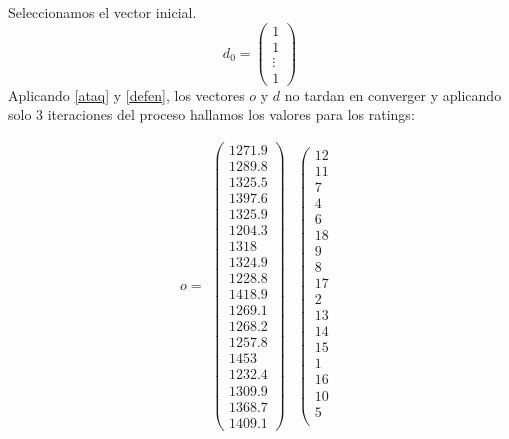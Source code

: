 	Seleccionamos el vector inicial.
	\begin{equation*}
		d_{0} = 
		\left( \begin{array}{c}
			1\\
			1\\
			\vdots\\
			1
		\end{array}\right) 
	\end{equation*}
	Aplicando \ref{ataq} y \ref{defen}, los vectores $o$ y $d$ no tardan en converger y aplicando solo 3 iteraciones del proceso hallamos los valores para los ratings:
	
	\[o=
	\begin{array}{ccc}
	\left(\begin{array}{c}
				1271.9\\
				1289.8\\
				1325.5\\
				1397.6\\
				1325.9\\
				1204.3\\
				1318\\
				1324.9\\
				1228.8\\
				1418.9\\
				1269.1\\
				1268.2\\
				1257.8\\
				1453\\
				1232.4\\
				1309.9\\
				1368.7\\
				1409.1
	\end{array} \right) & \left(\begin{array}{c}
				12\\
				11\\
				7\\
				4\\
				6\\
				18\\
				9\\
				8\\
				17\\
				2\\
				13\\
				14\\
				15\\
				1\\
				16\\
				10\\
				5\\

\end{array}
\end{array}\]
